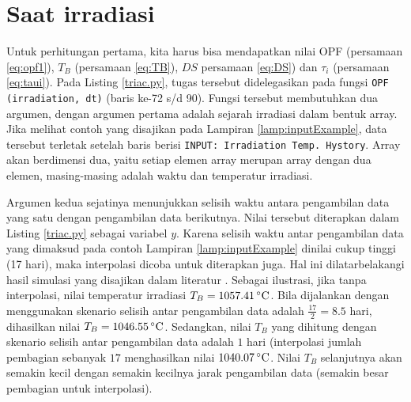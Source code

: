 \documentclass[a4paper,11pt]{report}
\begin{document}
\section{Saat irradiasi}
Untuk perhitungan pertama, kita harus bisa mendapatkan nilai OPF (persamaan \ref{eq:opf1}), $T_B$ (persamaan \ref{eq:TB}), $DS$ persamaan \ref{eq:DS}) dan $\tau_i$ (persamaan \ref{eq:taui}). Pada Listing \ref{triac.py}, tugas tersebut didelegasikan pada fungsi \texttt{OPF (irradiation, dt)} (baris ke-72 s/d 90). Fungsi tersebut membutuhkan dua argumen, dengan argumen pertama adalah sejarah irradiasi dalam bentuk array. Jika melihat contoh yang disajikan pada Lampiran \ref{lamp:inputExample}, data tersebut terletak setelah baris berisi \texttt{INPUT: Irradiation Temp. Hystory}. Array akan berdimensi dua, yaitu setiap elemen array merupan array dengan dua elemen, masing-masing adalah waktu dan temperatur irradiasi.

Argumen kedua sejatinya menunjukkan selisih waktu antara pengambilan data yang satu dengan pengambilan data berikutnya. Nilai tersebut diterapkan dalam Listing \ref{triac.py} sebagai variabel $y$. Karena selisih waktu antar pengambilan data yang dimaksud pada contoh Lampiran \ref{lamp:inputExample} dinilai cukup tinggi (17 hari), maka interpolasi dicoba untuk diterapkan juga. Hal ini dilatarbelakangi hasil simulasi yang disajikan dalam literatur \cite{report1}. Sebagai ilustrasi, jika tanpa interpolasi, nilai temperatur irradiasi $T_B=1057.41\,^{\circ}{\rm C}$. Bila dijalankan dengan menggunakan skenario selisih antar pengambilan data adalah $\frac{17}{2}=8.5$ hari, dihasilkan nilai $T_B=1046.55\,^{\circ}{\rm C}$. Sedangkan, nilai $T_B$ yang dihitung dengan skenario selisih antar pengambilan data adalah $1$ hari (interpolasi jumlah pembagian sebanyak $17$ menghasilkan nilai $1040.07\,^{\circ}{\rm C}$. Nilai $T_B$ selanjutnya akan semakin kecil dengan semakin kecilnya jarak pengambilan data (semakin besar pembagian untuk interpolasi).






\begin{appendix}
	
	\setcounter{page}{2}
	
\end{appendix}
\end{document}
